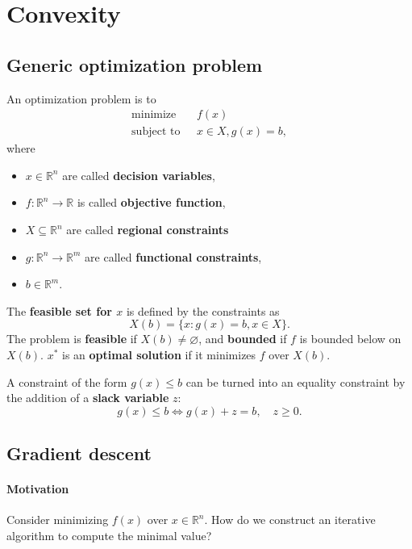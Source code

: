 \section{Convexity}
\subsection{Generic optimization problem}

\begin{definition}
    An optimization problem is to 
    \begin{align*}
        \text{minimize}\ \ \ & f(x)\\ 
        \text{subject to}\ \ \ & x\in X, g(x) = b, 
    \end{align*}
    where
    \begin{itemize}
        \item $ x\in \mathbb{R}^{n} $ are called \textbf{decision variables},
        \item $ f: \mathbb{R}^{n}\to \mathbb{R} $ is called \textbf{objective function},
        \item $ X \subseteq \mathbb{R}^{n} $ are called \textbf{regional constraints}
        \item $ g: \mathbb{R}^{n} \to \mathbb{R}^{m} $ are called \textbf{functional constraints},
        \item $ b\in \mathbb{R}^{m} $. 
    \end{itemize}
\end{definition}
\begin{definition}
    The \textbf{feasible set for $x$} is defined by the constraints as 
    \[
        X(b) = \{x: g(x)=b,x\in X\}. 
    \]
    The problem is \textbf{feasible} if $X(b)\neq \varnothing$, and \textbf{bounded} if $f$ is bounded below on $X(b)$. $ x^* $ is an \textbf{optimal solution} if it minimizes $f$ over $X(b)$.
\end{definition}
\begin{note}
    A constraint of the form $ g(x)\le b $ can be turned into an equality constraint by the addition of a \textbf{slack variable} $z$:
    \[
        g(x)\le b \iff g(x) + z = b,\quad z\ge 0.
    \]
\end{note}

\subsection{Gradient descent}
\paragraph{Motivation}
Consider minimizing $f(x)$ over $ x\in \mathbb{R}^{n} $. How do we construct an iterative algorithm to compute the minimal value?

